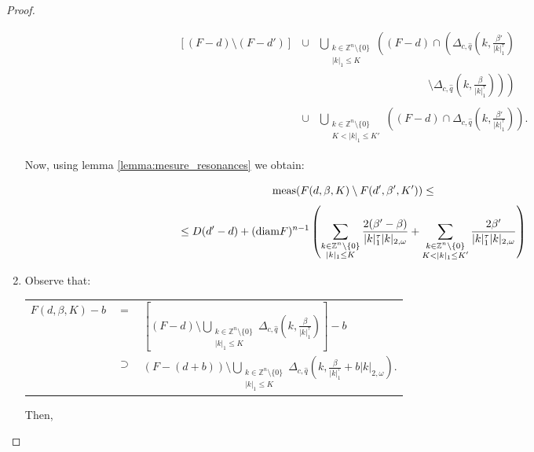 \begin{proof}
\begin{enumerate}
$$
\begin{array}{rcl}
[(F-d)\setminus (F-d')] & \cup &  \displaystyle \bigcup_{\substack{k\in\mathbb{Z}^n\setminus\{0\} \\ |k|_1 \leq K}} \left((F-d)\cap\left(\Delta_{c,\hat q}\left(k,\frac{\beta'}{|k|_1^\tau}\right)
\right.\right.
\\
& & \displaystyle \qquad \qquad \qquad \qquad \qquad \left.\left.
\setminus\Delta_{c,\hat q}\left(k,\frac{\beta}{|k|_1^\tau}\right)\right)\right)\\
\\
 & \cup & \displaystyle \bigcup_{\substack{k\in\mathbb{Z}^n\setminus\{0\} \\ K < |k|_1 \leq K'}} \left((F-d)\cap\Delta_{c,\hat q}\left(k,\frac{\beta'}{|k|_1^\tau}\right)\right).
\end{array}
$$

Now, using lemma \ref{lemma:mesure_resonances} we obtain:

$$
\textnormal{meas}(F(d,\beta,K)\setminus F(d',\beta',K')) \leq
$$
$$
\leq D(d'-d) + (\textnormal{diam}F)^{n-1}\left(\sum_{\substack{k\in\mathbb{Z}^n\setminus\{0\} \\ |k|_1 \leq K}}\frac{2(\beta'-\beta)}{|k|_1^\tau|k|_{2,\omega}}+ \sum_{\substack{k\in\mathbb{Z}^n\setminus\{0\} \\ K < |k|_1 \leq K'}}\frac{2\beta'}{|k|_1^\tau|k|_{2,\omega}}\right)
$$

\item
Observe that:


\begin{longtable}{rcl}
 $F(d,\beta,K) - b$ & $=$& $\displaystyle\left[(F-d) \setminus \bigcup_{\substack{k\in\mathbb{Z}^n\setminus\{0\} \\ |k|_1 \leq K}} \Delta_{c,\hat q} \left(k,\frac{\beta}{|k|_1^\tau}\right)\right] - b$\\
 & $\supset$ & $\displaystyle (F - (d+b))\setminus \bigcup_{\substack{k\in\mathbb{Z}^n\setminus\{0\} \\ |k|_1 \leq K}} \Delta_{c,\hat q} \left(k,\frac{\beta}{|k|_1^\tau} + b|k|_{2,\omega}\right).$ \\
\end{longtable}

Then,


\end{enumerate}
\end{proof}
